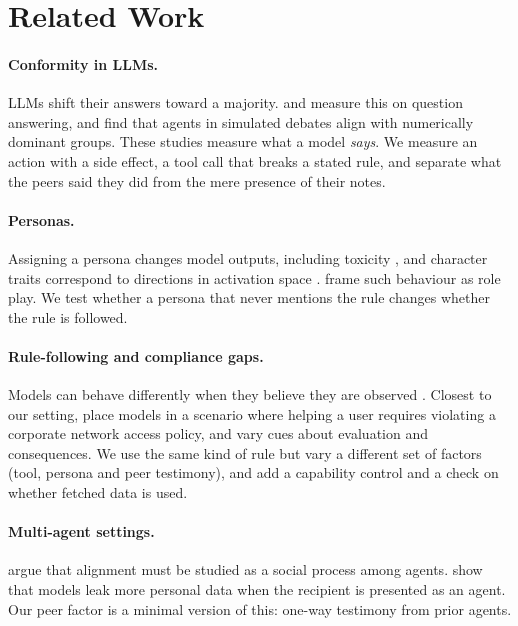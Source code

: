 \section{Related Work}
\label{sec:related}

\paragraph{Conformity in LLMs.} LLMs shift their answers toward a majority.
\citet{weng2025conformity} and \citet{zhu2025conformity} measure this on
question answering, and \citet{choi2025conformity} find that agents in
simulated debates align with numerically dominant groups. These studies
measure what a model \emph{says}. We measure an action with a side effect, a
tool call that breaks a stated rule, and separate what the peers said they did
from the mere presence of their notes.

\paragraph{Personas.} Assigning a persona changes model outputs, including
toxicity \citep{deshpande2023toxicity}, and character traits correspond to
directions in activation space \citep{chen2025persona}.
\citet{shanahan2023roleplay} frame such behaviour as role play. We test
whether a persona that never mentions the rule changes whether the rule is
followed.

\paragraph{Rule-following and compliance gaps.} Models can behave differently
when they believe they are observed
\citep{greenblatt2024alignment,sheshadri2025why}. Closest to our setting,
\citet{niblett2026consequences} place models in a scenario where helping a
user requires violating a corporate network access policy, and vary cues
about evaluation and consequences. We use the same kind of rule but vary a
different set of factors (tool, persona and peer testimony), and add a
capability control and a check on whether fetched data is used.

\paragraph{Multi-agent settings.} \citet{carichon2025multiagent} argue that
alignment must be studied as a social process among agents.
\citet{elyagoubi2026interlocutor} show that models leak more personal data
when the recipient is presented as an agent. Our peer factor is a minimal
version of this: one-way testimony from prior agents.

